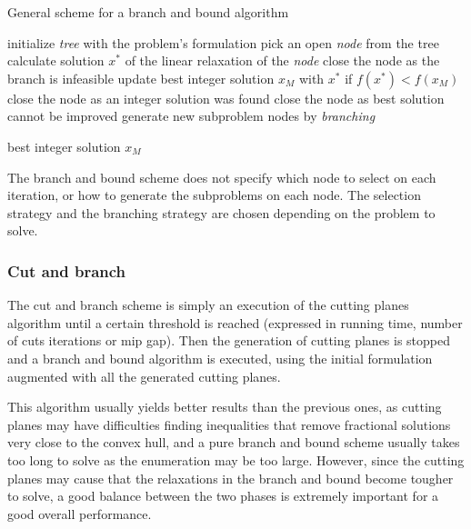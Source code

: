 \begin{algorithm}
\caption{General scheme for a branch and bound algorithm}
\label{alg:branchnbound}

\begin{algorithmic}

\STATE initialize \textit{tree} with the problem's formulation
\STATE 
{}
	\STATE pick an open \textit{node} from the tree
	\STATE calculate solution $x^*$ of the linear relaxation of the \textit{node}
		\STATE close the node as the branch is infeasible
		\STATE update best integer solution $x_M$ with $x^*$ if $f(x^*) < f(x_M)$
		\STATE close the node as an integer solution was found
		\STATE close the node as best solution cannot be improved
	\ELSE
		\STATE generate new subproblem nodes by \textit{branching}
	\ENDIF
\ENDWHILE

\RETURN best integer solution $x_M$

\end{algorithmic}
\end{algorithm}

The branch and bound scheme does not specify which node to select on each iteration, or how to generate the subproblems on each node. The selection strategy and the branching strategy are chosen depending on the problem to solve.

\subsubsection{Cut and branch}

The cut and branch scheme is simply an execution of the cutting planes algorithm until a certain threshold is reached (expressed in running time, number of cuts iterations or mip gap). Then the generation of cutting planes is stopped and a branch and bound algorithm is executed, using the initial formulation augmented with all the generated cutting planes.

This algorithm usually yields better results than the previous ones, as cutting planes may have difficulties finding inequalities that remove fractional solutions very close to the convex hull, and a pure branch and bound scheme usually takes too long to solve as the enumeration may be too large. However, since the cutting planes may cause that the relaxations in the branch and bound become tougher to solve, a good balance between the two phases is extremely important for a good overall performance.

